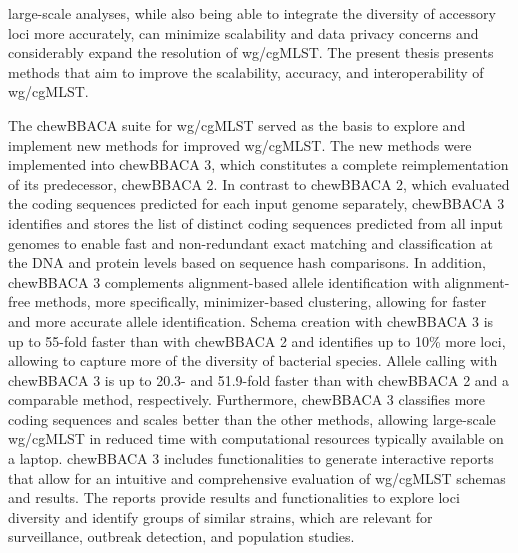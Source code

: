 large-scale analyses, while also being able to integrate the diversity of accessory loci more accurately, can minimize scalability and data privacy concerns and considerably expand the resolution of wg/cgMLST. The present thesis presents methods that aim to improve the scalability, accuracy, and interoperability of wg/cgMLST.

The chewBBACA suite for wg/cgMLST served as the basis to explore and implement new methods for improved wg/cgMLST. The new methods were implemented into chewBBACA 3, which constitutes a complete reimplementation of its predecessor, chewBBACA 2. In contrast to chewBBACA 2, which evaluated the coding sequences predicted for each input genome separately, chewBBACA 3 identifies and stores the list of distinct coding sequences predicted from all input genomes to enable fast and non-redundant exact matching and classification at the DNA and protein levels based on sequence hash comparisons. In addition, chewBBACA 3 complements alignment-based allele identification with alignment-free methods, more specifically, minimizer-based clustering, allowing for faster and more accurate allele identification. Schema creation with chewBBACA 3 is up to 55-fold faster than with chewBBACA 2 and identifies up to 10\% more loci, allowing to capture more of the diversity of bacterial species. Allele calling with chewBBACA 3 is up to 20.3- and 51.9-fold faster than with chewBBACA 2 and a comparable method, respectively. Furthermore, chewBBACA 3 classifies more coding sequences and scales better than the other methods, allowing large-scale wg/cgMLST in reduced time with computational resources typically available on a laptop. chewBBACA 3 includes functionalities to generate interactive reports that allow for an intuitive and comprehensive evaluation of wg/cgMLST schemas and results. The reports provide results and functionalities to explore loci diversity and identify groups of similar strains, which are relevant for surveillance, outbreak detection, and population studies.

